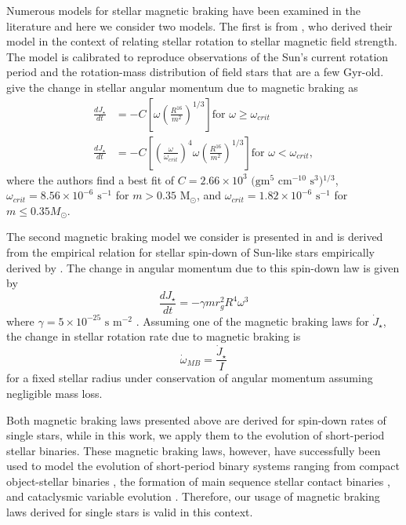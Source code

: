 Numerous models for stellar magnetic braking have been examined in the literature and here we consider two models.  The first is from \citet{Reiners2012}, who derived their model in the context of relating stellar rotation to stellar magnetic field strength.  The model is calibrated to reproduce observations of the Sun's current rotation period and the rotation-mass distribution of field stars that are a few Gyr-old.  \citet{Reiners2012} give the change in stellar angular momentum due to magnetic braking as
\begin{equation} \label{STEEP:eqn:ang_mom_loss_reiners}
\begin{split}
\frac{dJ_{\star}}{dt} & = -C \left[ \omega \left(\frac{R^{16}}{m^2} \right)^{1/3} \right] \text{for $\omega \geq \omega_{crit}$} \\
\frac{dJ_{\star}}{dt} & = -C \left[ \left( \frac{\omega}{\omega_{crit}} \right)^4 \omega \left(\frac{R^{16}}{m^2} \right)^{1/3} \right] \text{for $\omega < \omega_{crit}$},
\end{split}
\end{equation}
where the authors find a best fit of $C = 2.66 \times 10^3 \text{ (gm$^5$ cm$^{-10}$ s$^3$)$^{1/3}$}$, $\omega_{crit} = 8.56 \times 10^{-6}\text{ s$^{-1}$}$ for $m > 0.35$ M$_{\odot}$, and $\omega_{crit} = 1.82 \times 10^{-6} \text{ s$^{-1}$}$ for $m \leq 0.35 M_{\odot}$.

The second magnetic braking model we consider is presented in \citet{Repetto2014} and is derived from the empirical relation for stellar spin-down of Sun-like stars empirically derived by \citet{Skumanich1972}.  The change in angular momentum due to this spin-down law is given by
\begin{equation} \label{STEEP:eqn:ang_mom_loss_skumanich}
\frac{dJ_{\star}}{dt} = - \gamma m r_g^2 R^4 \omega^3
\end{equation}
where $\gamma = 5 \times 10^{-25} \text{ s m}^{-2}$ \citep{Repetto2014}.  Assuming one of the magnetic braking laws for $\dot{J}_{\star}$, the change in stellar rotation rate due to magnetic braking is
\begin{equation} \label{STEEP:eqn:rot_rate_dt}
\dot{\omega}_{MB} = \frac{\dot{J}_{\star}}{I}
\end{equation}
for a fixed stellar radius under conservation of angular momentum assuming negligible mass loss.  

Both magnetic braking laws presented above are derived for spin-down rates of single stars, while in this work, we apply them to the evolution of short-period stellar binaries.  These magnetic braking laws, however, have successfully been used to model the evolution of short-period binary systems ranging from compact object-stellar binaries \citep[e.g.][]{Verbunt1981,Repetto2014}, the formation of main sequence stellar contact binaries \citep[e.g.][]{Stepien1995,Andronov2006}, and cataclysmic variable evolution \citep[e.g.][]{Ivanova2003}.  Therefore, our usage of magnetic braking laws derived for single stars is valid in this context.

